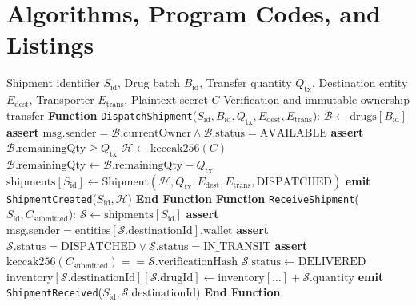 \documentclass[11pt,a4paper]{article}
\begin{document}
\section{Algorithms, Program Codes, and Listings}

\begin{algorithm}[htbp]
\caption{Zero-Trust Cryptographic Delivery Handoff and Inventory Settlement}
\label{alg:handoff}
\begin{algorithmic}[1]
\Require Shipment identifier $S_{\text{id}}$, Drug batch $B_{\text{id}}$, Transfer quantity $Q_{\text{tx}}$, Destination entity $E_{\text{dest}}$, Transporter $E_{\text{trans}}$, Plaintext secret $C$
\Ensure Verification and immutable ownership transfer
\State \textbf{Function} \texttt{DispatchShipment}($S_{\text{id}}, B_{\text{id}}, Q_{\text{tx}}, E_{\text{dest}}, E_{\text{trans}}$):
\State \quad $\mathcal{B} \gets \text{drugs}[B_{\text{id}}]$
\State \quad \textbf{assert} $\text{msg.sender} = \mathcal{B}.\text{currentOwner} \land \mathcal{B}.\text{status} = \text{AVAILABLE}$
\State \quad \textbf{assert} $\mathcal{B}.\text{remainingQty} \ge Q_{\text{tx}}$
\State \quad $\mathcal{H} \gets \text{keccak256}(C)$
\State \quad $\mathcal{B}.\text{remainingQty} \gets \mathcal{B}.\text{remainingQty} - Q_{\text{tx}}$
\State \quad $\text{shipments}[S_{\text{id}}] \gets \text{Shipment}(\mathcal{H}, Q_{\text{tx}}, E_{\text{dest}}, E_{\text{trans}}, \text{DISPATCHED})$
\State \quad \textbf{emit} \texttt{ShipmentCreated}($S_{\text{id}}, \mathcal{H}$)
\State \textbf{End Function}
\Statex
\State \textbf{Function} \texttt{ReceiveShipment}($S_{\text{id}}, C_{\text{submitted}}$):
\State \quad $\mathcal{S} \gets \text{shipments}[S_{\text{id}}]$
\State \quad \textbf{assert} $\text{msg.sender} = \text{entities}[\mathcal{S}.\text{destinationId}].\text{wallet}$
\State \quad \textbf{assert} $\mathcal{S}.\text{status} = \text{DISPATCHED} \lor \mathcal{S}.\text{status} = \text{IN\_TRANSIT}$
\State \quad \textbf{assert} $\text{keccak256}(C_{\text{submitted}}) == \mathcal{S}.\text{verificationHash}$
\State \quad $\mathcal{S}.\text{status} \gets \text{DELIVERED}$
\State \quad $\text{inventory}[\mathcal{S}.\text{destinationId}][\mathcal{S}.\text{drugId}] \gets \text{inventory}[\dots] + \mathcal{S}.\text{quantity}$
\State \quad \textbf{emit} \texttt{ShipmentReceived}($S_{\text{id}}, \mathcal{S}.\text{destinationId}$)
\State \textbf{End Function}
\end{algorithmic}
\end{algorithm}
\end{document}
